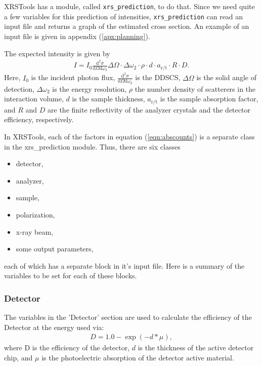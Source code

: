 \documentclass[aps,prl,groupedaddress]{revtex4}
\begin{document}
XRSTools has a module, called \texttt{xrs\_prediction}, to do that. Since we need quite a few variables for this prediction of intensities, \texttt{xrs\_prediction} can read an input file and returns a graph of the estimated cross section. An example of an input file is given in appendix (\ref{apx:planning}).

The expected intensity is given by
\begin{eqnarray}
I = I_0 \frac{\mathrm{d}^2 \sigma}{\mathrm{d}\Omega \mathrm{d}\omega_2} \Delta\Omega \cdot \Delta\omega_2 \cdot \rho \cdot d \cdot a_{\mathrm{r/t}} \cdot R \cdot D .
\label{eqn:abscounts}
\end{eqnarray}
Here, $I_0$ is the incident photon flux, $\frac{\mathrm{d}^2 \sigma}{\mathrm{d}\Omega \mathrm{d}\omega_2}$ is the DDSCS, $\Delta\Omega$ is the solid angle of detection, $\Delta\omega_2$ is the energy resolution, $\rho$ the number density of scatterers in the interaction volume, $d$ is the sample thickness, $a_{\mathrm{r/t}}$ is the sample absorption factor, and $R$ and $D$ are the finite reflectivity of the analyzer crystals and the detector efficiency, respectively.

In XRSTools, each of the factors in equation (\ref{eqn:abscounts}) is a separate class in the xrs\_prediction module. Thus, there are six classes

\begin{itemize}
 \item detector,
 \item analyzer,
 \item sample,
 \item polarization,
 \item x-ray beam,
 \item some output parameters,
\end{itemize}
each of which has a separate block in it's input file. Here is a summary of the variables to be set for each of these blocks.

\subsubsection{Detector}
The variables in the 'Detector' section are used to calculate the efficiency of the Detector at the energy used via:
\begin{eqnarray}
D = 1.0 - \exp(-d*\mu) , 
\end{eqnarray}
where D is the efficiency of the detector, $d$ is the thickness of the active detector chip, and $\mu$ is the photoelectric absorption of the detector active material.
\end{document}

